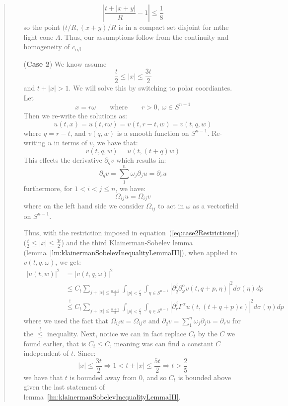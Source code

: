 \documentclass{book}
\newenvironment{Proof}[1][]
  {\begin{ProofTcb}[#1]}
  {\end{ProofTcb}}
\renewcommand{\bf}[1]{\textbf{#1}}
\newcommand{\Rw}{\Rightarrow}
\begin{document}
\begin{Proof}
\begin{quote}
\begin{enumerate}
				\[
					\left| \frac{t + |x+y|}{R} - 1\right| \le \frac{1}{8}
				\]
				so the point $(t/R, (x+y)/R$ is in a compact set disjoint for mthe light cone $\Lambda$.
				Thus, our assumptions follow from the continuity and homogeneity of $c_{\alpha\beta}$
			\item[(\bf{Case 2})] We know assume
				\begin{equation}\label{eq:case2Restrictions}
				  \frac{t}{2} \le |x| \le \frac{3t}{2}
				\end{equation}
				and $t + |x| > 1$. We will solve this by switching to polar coordiantes. Let
				\[
					x = r\omega \qquad \text{where} \qquad  r > 0,\ \omega \in S^{n-1}
				\]
				Then we re-write the solutions as:
				\[
					u(t,x)  =u(t, r\omega) = v(t,r-t,w) = v(t,q,w)
				\]
				where $q = r-t$, and $v(q,w)$ is a smooth function on $S^{n-1}$. Re-writing $u$ in terms of $v$, we have
				that:
				\[
					v(t,q,w) = u(t, (t+q)w)
				\]
				This effects the derivative $  \partial_q v$ which results in:
				\[
					 \partial_q v = \sum_1^n \omega_j  \partial_j u =  \partial_r u
				 \]
				 furthermore, for $1 < i < j \le n$, we have:
				 \[
					 \Omega_{ij} u = \Omega_{ij} v
				 \]
				 where on the left hand side we consider $\Omega_{ij}$ to act in $\omega$ as a vectorfield on $S^{n-1}$.

				 Thus, with the restriction imposed in equation~(\ref{eq:case2Restrictions}) ($\frac{t}{2} \le |x| \le
				 \frac{3t}{2}$) and the third Klainerman-Sobelev lemma
				 (lemma~\ref{lm:klainermanSobelevInequalityLemmaIII}), when applied to $v(t,q,\omega)$, we get:
				 \begin{align}\label{eq:longChainOfEquations}
					 |u(t,w)|^2 &= |v(t,q,\omega)|^2\\
								&\le C_t \sum_{j + |\alpha| \le \frac{n+2}{2}}
								\int_{|p| < \frac{t}{4}} \int_{\eta \in S^{n-1}}
								|  \partial_q^j  \partial_\omega^\alpha
								v(t, q+p, \eta)|^2 d\sigma(\eta)dp\\
								&\overset{!}{\le} C_t \sum_{j + |\alpha| \le \frac{n+2}{2}}
								\int_{|p| < \frac{t}{4}} \int_{\eta \in S^{n-1}}
								\left|  \partial_r^j \Gamma^\alpha u(t,
								(t+q+p)\epsilon)\right|^2 d\sigma(\eta)dp
				 \end{align}
				 where we used the fact that $\Omega_{ij} u = \Omega_{ij} v$ and $ \partial_q
				 v = \sum_1^n \omega_j  \partial_j u =  \partial_r u$ for the
				 $\overset{!}{\le}$ inequality. Next, notice we can in fact replace $C_t$ by the $C$
				 we found earlier, that is $C_t \le C$, meaning was can find a constant $C$
				 independent of $t$. Since:
				 \[
					 |x| \le \frac{3t}{2} \Rw 1 < t + |x| \le \frac{5t}{2} \Rw t > \frac{2}{5}
				 \]
				 we have that $t$ is bounded away from $0$, and so $C_t$ is bounded above given the
				 last statement of lemma~\ref{lm:klainermanSobelevInequalityLemmaIII}.


\end{enumerate}
\end{quote}
\end{Proof}
\end{document}

